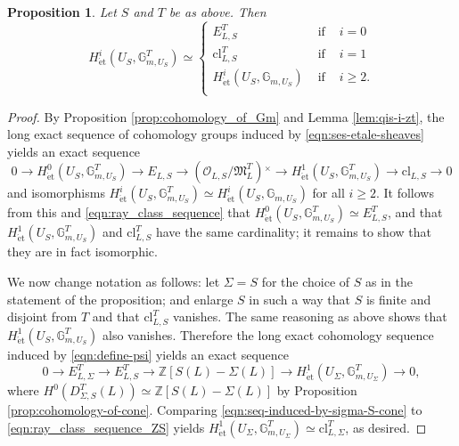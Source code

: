 \documentclass[12pt]{amsart}
\theoremstyle{plain}
\newtheorem{prop}[theorem]{Proposition}
\theoremstyle{remark}
\theoremstyle{definition}
\numberwithin{equation}{section}
\begin{document}
{\begin{prop}\label{prop:cohomology_of_GmT}
Let $S$ and $T$ be as above. Then
\[
H^{i}_{\mathrm{\acute{e}t}}(U_{S}, \mathbb{G}_{m,U_{S}}^{T}) \simeq \left\{
\begin{array}{lll}
E_{L,S}^{T} & \mbox{ if } & i=0\\
{\mathrm{cl}}_{L,S}^{T} & \mbox{ if } & i=1\\
H^{i}_{\mathrm{\acute{e}t}}(U_{S}, \mathbb{G}_{m,U_{S}}) & \mbox{ if } & i \geq 2.\\
\end{array}
\right.
\]
\end{prop}

\begin{proof}
By Proposition \ref{prop:cohomology_of_Gm} and Lemma \ref{lem:qis-i-zt}, the 
long exact sequence of cohomology groups induced by \eqref{eqn:ses-etale-sheaves} yields an exact sequence
\[
0 \longrightarrow H^{0}_{\mathrm{\acute{e}t}}(U_{S}, \mathbb{G}_{m,U_{S}}^{T}) \longrightarrow E_{L,S} \longrightarrow (\mathcal{O}_{L,S} / \mathfrak{M}_{L}^{T}){^{\times}}
\longrightarrow H^{1}_{\mathrm{\acute{e}t}}(U_{S}, \mathbb{G}_{m,U_{S}}^{T}) \longrightarrow {\mathrm{cl}}_{L,S} \longrightarrow 0
\]
and isomorphisms $ H^{i}_{\mathrm{\acute{e}t}}(U_{S}, \mathbb{G}_{m,U_{S}}^{T}) \simeq H^{i}_{\mathrm{\acute{e}t}}(U_{S}, \mathbb{G}_{m,U_{S}})$ for all $i \geq 2$.
It follows from this and \eqref{eqn:ray_class_sequence} that 
$H^{0}_{\mathrm{\acute{e}t}}(U_{S}, \mathbb{G}_{m,U_{S}}^{T})  \simeq E_{L,S}^{T}$, and that
$H^{1}_{\mathrm{\acute{e}t}}(U_{S}, \mathbb{G}_{m,U_{S}}^{T})$ and ${\mathrm{cl}}_{L,S}^{T}$ have the same cardinality;
it remains to show that they are in fact isomorphic. 

We now change notation as follows: let $\Sigma=S$ for the choice of $S$ as in the statement of the proposition; and
enlarge $S$ in such a way that $S$ is finite and disjoint from $T$ and that ${\mathrm{cl}}_{L,S}^{T}$ vanishes.
The same reasoning as above shows that $H^{1}_{\mathrm{\acute{e}t}}(U_{S}, \mathbb{G}_{m,U_{S}}^{T})$ also vanishes.
Therefore the long exact cohomology sequence induced 
by \eqref{eqn:define-psi} yields an exact sequence
\begin{equation}\label{eqn:seq-induced-by-sigma-S-cone}
0 \longrightarrow E_{L, \Sigma}^T \longrightarrow E_{L,S}^T \longrightarrow
{\mathbb{Z}} [S(L) - \Sigma(L)] \longrightarrow H_{\mathrm{\acute{e}t}}^{1}(U_{\Sigma},\mathbb{G}_{m,U_{\Sigma}}^{T}) \longrightarrow 0,
\end{equation}
where $H^{0}(D_{\Sigma,S}^{T}(L)) \simeq {\mathbb{Z}} [S(L) - \Sigma(L)]$ by Proposition \ref{prop:cohomology-of-cone}.
Comparing \eqref{eqn:seq-induced-by-sigma-S-cone} to \eqref{eqn:ray_class_sequence_ZS} yields 
$H_{\mathrm{\acute{e}t}}^{1}(U_{\Sigma},\mathbb{G}_{m,U_{\Sigma}}^{T}) \simeq {\mathrm{cl}}_{L,\Sigma}^{T}$, as desired.
\end{proof}

}
\end{document}

